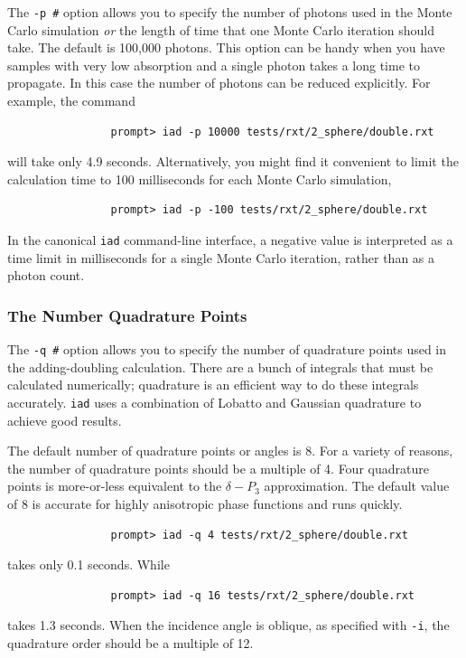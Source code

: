 \documentclass{article}
\newcommand\iadprog{\texttt{iad}}
\begin{document}
The \texttt{-p \#} option allows you to specify the number of photons used
in the Monte Carlo simulation \textit{or} the length of time that one Monte
Carlo iteration should take.  The default is 100,000 photons.  
This option can be handy when you have samples with
very low absorption and a single photon takes a long time to propagate.  In
this case the number of photons can be reduced explicitly.  For example, 
the command
\begin{verbatim}
                prompt> iad -p 10000 tests/rxt/2_sphere/double.rxt
\end{verbatim}
will take only 4.9 seconds.  Alternatively,
you might find it convenient to limit the calculation time to 100 milliseconds
for each Monte Carlo simulation,
\begin{verbatim}
                prompt> iad -p -100 tests/rxt/2_sphere/double.rxt
\end{verbatim}
In the canonical \texttt{iad} command-line interface, a negative value is
interpreted as a time limit in milliseconds for a single Monte Carlo iteration,
rather than as a photon count.

\subsubsection{The Number Quadrature Points}
The \texttt{-q \#} option allows you to specify the number of quadrature
points used in the adding-doubling calculation.  There are a bunch of 
integrals that must be calculated numerically; quadrature is an efficient 
way to do these integrals accurately.  \iadprog{} uses a combination of 
Lobatto and Gaussian quadrature to achieve good results.

The default number of quadrature points or angles is 8.
For a variety of reasons, the number of quadrature points should be a
multiple of 4.  Four quadrature points is more-or-less equivalent to the
$\delta-P_3$ approximation.  The default value of 8 is accurate for highly
anisotropic phase functions and runs quickly.
\begin{verbatim}
                prompt> iad -q 4 tests/rxt/2_sphere/double.rxt
\end{verbatim}
takes only 0.1 seconds.  While
\begin{verbatim}
                prompt> iad -q 16 tests/rxt/2_sphere/double.rxt
\end{verbatim}
takes 1.3 seconds.
When the incidence angle is oblique, as specified with \texttt{-i}, the
quadrature order should be a multiple of 12.
\end{document}
